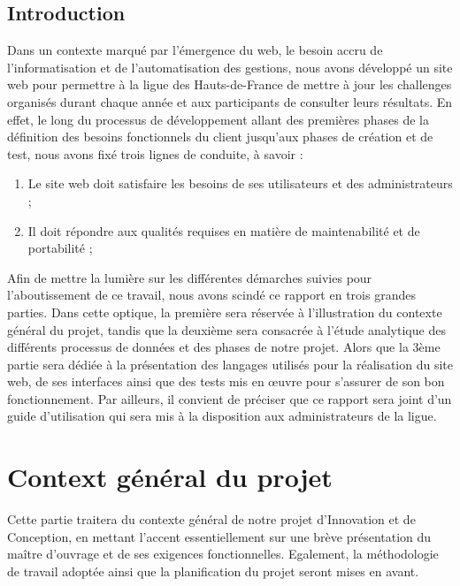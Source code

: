 \documentclass[12pt,a4paper]{report}
\begin{document}
	\tableofcontents
	
	\newpage
	
	\listoffigures
	
	\newpage
	\section*{Introduction}
	Dans un contexte marqué par l’émergence du web, le besoin accru de l’informatisation et de l’automatisation des gestions, nous avons développé un site web pour permettre à la ligue des Hauts-de-France de mettre à jour les challenges organisés durant chaque année et aux participants de consulter leurs résultats.
	En effet, le long du processus de développement allant des premières phases de la définition des besoins fonctionnels du client jusqu’aux phases de création et de test, nous avons fixé trois lignes de conduite, à savoir :
	\begin{enumerate}
	\item Le site web doit satisfaire les besoins de ses utilisateurs et des administrateurs ;
	\item Il doit répondre aux qualités requises en matière de maintenabilité et de portabilité ;
	\end{enumerate}
	Afin de mettre la lumière sur les différentes démarches suivies pour l’aboutissement de ce travail, nous avons scindé ce rapport en trois grandes parties. Dans cette optique, la première sera réservée à l’illustration du contexte général du projet, tandis que la deuxième sera consacrée à l’étude analytique des différents processus de données et des phases de notre projet. Alors que la 3ème partie sera dédiée à la présentation des langages utilisés pour la réalisation du site web, de ses interfaces ainsi que des tests mis en œuvre pour s’assurer de son bon fonctionnement. Par ailleurs, il convient de préciser que ce rapport sera joint d’un guide d’utilisation qui sera mis à la disposition aux administrateurs de la ligue.
	\chapter{Context général du projet}
	Cette partie traitera du contexte général de notre projet d’Innovation et de Conception, en mettant l’accent essentiellement sur une brève présentation du maître d'ouvrage et de ses exigences fonctionnelles. Egalement, la méthodologie de travail adoptée ainsi que la planification du projet seront mises en avant.  
	
\end{document}
